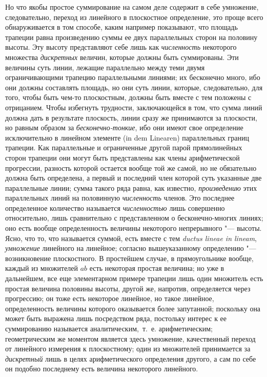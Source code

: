 Но что якобы простое суммирование на самом деле содержит в себе умножение,
следовательно, переход из линейного в плоскостное определение, это проще
всего обнаруживается в том способе, каким например показывают, что площадь
трапеции равна произведению суммы ее двух параллельных сторон на половину
высоты. Эту высоту представляют себе лишь как
{\em численность} некоторого множества
{\em дискретных} величин, которые должны быть
суммированы. Эти величины суть линии, лежащие параллельно между теми двумя
ограничивающими трапецию параллельными линиями; их бесконечно много, ибо
они должны составлять площадь, но они суть линии, которые, следовательно,
для того, чтобы быть чем-то плоскостным, должны быть вместе с тем положены
с отрицанием. Чтобы избегнуть трудности, заключающейся в том, что сумма
линий должна дать в результате плоскость, линии сразу же принимаются за
плоскости, но равным образом за
{\em бесконечно-тонкие}, ибо они имеют свое определение
исключительно в линейном элементе (in dem Linearen) параллельных границ
трапеции. Как параллельные и ограниченные другой парой прямолинейных сторон
трапеции они могут быть представлены как члены арифметической прогрессии,
разность которой остается вообще той же самой, но не обязательно должна
быть определена, а первый и последний член которой суть указанные две
параллельные линии; сумма такого ряда равна, как известно,
{\em произведению} этих параллельных линий на
половинную {\em численность} членов. Это последнее
определенное количество называется {\em численностью}
лишь совершенно относительно, лишь сравнительно с представленном о
бесконечно-многих линиях; оно есть вообще определенность величины
некоторого {непрерывного} "--- высоты. Ясно, что то,
что называется суммой, есть вместе с тем {\em ductus
lineae in lineam}, {\em умножение} линейного на
линейное; согласно вышеуказанному определению "--- возникновение плоскостного.
В простейшем случае, в прямоугольнике вообще, каждый из множителей
$ab$ есть некоторая простая величина; но уже в
дальнейшем, все еще элементарном примере трапеции лишь один множитель есть
простая величина половины высоты, другой же, напротив, определяется через
прогрессию; он тоже есть некоторое линейное, но такое линейное,
определенность величины которого оказывается более запутанной; поскольку
она может быть выражена лишь посредством ряда, постольку интерес к ее
суммированию называется аналитическим,~т.~е. арифметическим; геометрическим
же моментом является здесь умножение, качественный переход от линейного
измерения к плоскостному; один из множителей принимается за
{\em дискретный} лишь в целях арифметического
определения другого, а сам по себе он подобно последнему есть величина
некоторого линейного.

